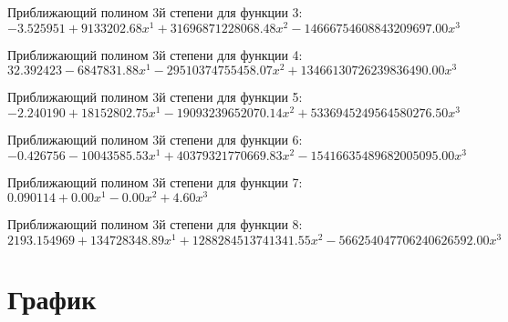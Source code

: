 \documentclass[a4paper,14pt]{extarticle}
\begin{document}
Приближающий полином 3й степени для функции 3: $-3.525951 + 9133202.68x^1 + 31696871228068.48x^2 - 14666754608843209697.00x^3$

Приближающий полином 3й степени для функции 4: $32.392423 - 6847831.88x^1 - 29510374755458.07x^2 + 13466130726239836490.00x^3$

Приближающий полином 3й степени для функции 5: $-2.240190 + 18152802.75x^1 - 19093239652070.14x^2 + 5336945249564580276.50x^3$

Приближающий полином 3й степени для функции 6: $-0.426756 - 10043585.53x^1 + 40379321770669.83x^2 - 15416635489682005095.00x^3$

Приближающий полином 3й степени для функции 7: $0.090114 + 0.00x^1 - 0.00x^2 + 4.60x^3$

Приближающий полином 3й степени для функции 8: $2193.154969 + 134728348.89x^1 + 1288284513741341.55x^2 - 566254047706240626592.00x^3$

\section{График}
\end{document}
